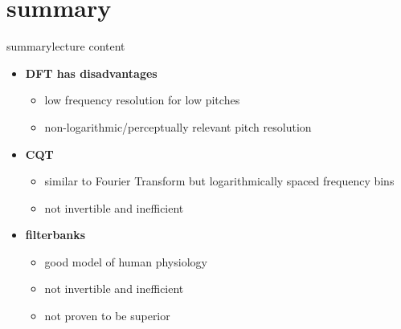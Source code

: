     \section{summary}
        \begin{frame}{summary}{lecture content}
            \begin{itemize}
                \item   \textbf{DFT has disadvantages}
                    \begin{itemize}
                        \item   low frequency resolution for low pitches
                        \item   non-logarithmic/perceptually relevant pitch resolution
                    \end{itemize}
                \bigskip
                \item      \textbf{CQT}
                    \begin{itemize}
                        \item   similar to Fourier Transform but logarithmically spaced frequency bins
                        \item   not invertible and inefficient
                    \end{itemize}
                \bigskip
                \item      \textbf{filterbanks}
                    \begin{itemize}
                        \item   good model of human physiology
                        \item   not invertible and inefficient
                        \item   not proven to be superior
                    \end{itemize}
            \end{itemize}
        \end{frame}

